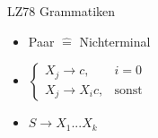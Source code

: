 \begin{frame}{\FrameName}
	\begin{block}{LZ78 Grammatiken}
		\begin{itemize}[<+->]
			\item Paar $\hat{=}$ Nichterminal
			\item $\begin{cases}
				X_j \rightarrow c, & i = 0\\
				X_j \rightarrow X_i c, & \text{sonst}
			\end{cases}$
			\item $S \rightarrow X_1 ... X_k$
			
		\end{itemize}
	
	\end{block}
	\end{frame}

